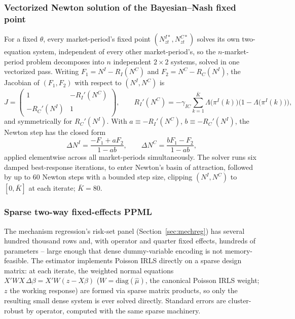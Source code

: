 \documentclass[english,12pt]{article}
\begin{document}
\subsubsection{Vectorized Newton solution of the Bayesian--Nash fixed point}
For a fixed $\theta$, every market-period's fixed point $(N^{I*}_{zt},N^{C*}_{zt})$ solves its own two-equation system, independent of every other market-period's, so the $n$-market-period problem decomposes into $n$ independent $2\times2$ systems, solved in one vectorized pass. Writing $F_1 = N^I - R_I(N^C)$ and $F_2 = N^C - R_C(N^I)$, the Jacobian of $(F_1,F_2)$ with respect to $(N^I,N^C)$ is
\[
J = \begin{pmatrix} 1 & -R_I'(N^C) \\ -R_C'(N^I) & 1 \end{pmatrix}, \qquad R_I'(N^C) = -\gamma_{IC}\sum_{k=1}^{\bar K}\Lambda\big(\pi^I(k)\big)\big(1-\Lambda\big(\pi^I(k)\big)\big),
\]
and symmetrically for $R_C'(N^I)$. With $a \equiv -R_I'(N^C)$, $b \equiv -R_C'(N^I)$, the Newton step has the closed form
\[
\Delta N^I = \frac{-F_1 + aF_2}{1-ab}, \qquad \Delta N^C = \frac{bF_1 - F_2}{1-ab},
\]
applied elementwise across all market-periods simultaneously. The solver runs six damped best-response iterations, to enter Newton's basin of attraction, followed by up to 60 Newton steps with a bounded step size, clipping $(N^I,N^C)$ to $[0,\bar K]$ at each iterate; $\bar K=80$.

\subsubsection{Sparse two-way fixed-effects PPML}
\label{app:ppml}
The mechanism regression's risk-set panel (Section~\ref{sec:mechreg}) has several hundred thousand rows and, with operator and quarter fixed effects, hundreds of parameters -- large enough that dense dummy-variable encoding is not memory-feasible. The estimator implements Poisson IRLS directly on a sparse design matrix: at each iterate, the weighted normal equations $X'WX\,\Delta\beta = X'W(z-X\beta)$ ($W=\text{diag}(\hat\mu)$, the canonical Poisson IRLS weight; $z$ the working response) are formed via sparse matrix products, so only the resulting small dense system is ever solved directly. Standard errors are cluster-robust by operator, computed with the same sparse machinery.

\newpage
\begin{singlespace}




\end{singlespace}
\end{document}
